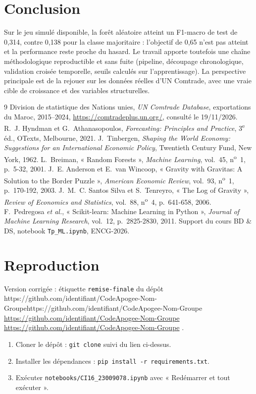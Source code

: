 \documentclass[11pt,a4paper]{article}
\newcounter{nbacompleter}
\newcommand{\lienDepot}{https://github.com/identifiant/CodeApogee-Nom-Groupe}
\newcommand{\lienParDefaut}{https://github.com/identifiant/CodeApogee-Nom-Groupe}
\newcommand{\afficherlien}{%
  \ifx\lienDepot\lienParDefaut
    \stepcounter{nbacompleter}\textcolor{red}{\expandafter\url\expandafter{\lienDepot}}%
  \else
    \expandafter\url\expandafter{\lienDepot}%
  \fi}
\begin{document}
\section{Conclusion}
\label{sec:conclusion}
Sur le jeu simulé disponible, la forêt aléatoire atteint un F1-macro de test de 0,314, contre 0,138 pour la classe majoritaire : l'objectif de 0,65 n'est pas atteint et la performance reste proche du hasard. Le travail apporte toutefois une chaîne méthodologique reproductible et sans fuite (pipeline, découpage chronologique, validation croisée temporelle, seuils calculés sur l'apprentissage). La perspective principale est de la rejouer sur les données réelles d'UN Comtrade, avec une vraie cible de croissance et des variables structurelles.

\begin{thebibliography}{9}
   Division de statistique des Nations unies, \textit{UN Comtrade Database}, exportations du Maroc, 2015--2024, \url{https://comtradeplus.un.org/}, consulté le 19/11/2026.
   R.~J. Hyndman et G.~Athanasopoulos, \textit{Forecasting: Principles and Practice}, 3\textsuperscript{e} éd., OTexts, Melbourne, 2021.
   J.~Tinbergen, \textit{Shaping the World Economy: Suggestions for an International Economic Policy}, Twentieth Century Fund, New York, 1962.
   L.~Breiman, « Random Forests », \textit{Machine Learning}, vol.~45, n\textsuperscript{o}~1, p.~5-32, 2001.
   J.~E. Anderson et E.~van Wincoop, « Gravity with Gravitas: A Solution to the Border Puzzle », \textit{American Economic Review}, vol.~93, n\textsuperscript{o}~1, p.~170-192, 2003.
   J.~M.~C. Santos Silva et S.~Tenreyro, « The Log of Gravity », \textit{Review of Economics and Statistics}, vol.~88, n\textsuperscript{o}~4, p.~641-658, 2006.
   F.~Pedregosa \textit{et al.}, « Scikit-learn: Machine Learning in Python », \textit{Journal of Machine Learning Research}, vol.~12, p.~2825-2830, 2011.
   Support du cours BD \& DS, notebook \texttt{Tp\_ML.ipynb}, ENCG-2026.
\end{thebibliography}

\appendix

\section{Reproduction}
\label{ann:reproduction}
Version corrigée : étiquette \texttt{remise-finale} du dépôt \afficherlien.
\begin{enumerate}
  \item Cloner le dépôt : \texttt{git clone} suivi du lien ci-dessus.
  \item Installer les dépendances : \texttt{pip install -r requirements.txt}.
  \item Exécuter \texttt{notebooks/CI16\_23009078.ipynb} avec « Redémarrer et tout exécuter ».
\end{enumerate}
\end{document}
